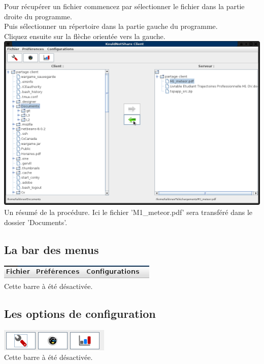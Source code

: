 \documentclass[12pt,a4paper]{article}
\begin{document}
\begin{center}
	Pour récupérer un fichier commencez par sélectionner le fichier dans la partie droite du programme. \\
	Puis sélectionner un répertoire dans la partie gauche du programme. \\
	Cliquez ensuite sur la flèche orientée vers la gauche. \\
	\includegraphics[scale=0.4]{images/get.png} \\
	Un résumé de la procédure. Ici le fichier 'M1\_meteor.pdf' sera transféré dans le dossier 'Documents'. 
\end{center}


\subsection{La bar des menus}
\begin{center}
	\includegraphics[scale=0.5]{images/menu.png} \\
	Cette barre à été désactivée.
\end{center}

\subsection{Les options de configuration}
\begin{center}
	\includegraphics[scale=0.5]{images/option.png} \\
	Cette barre à été désactivée.
\end{center}
\end{document}
